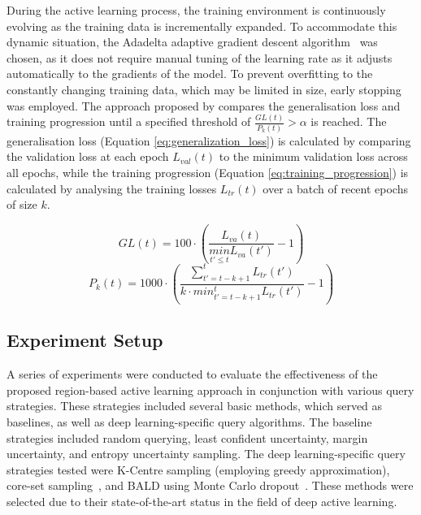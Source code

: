 During the active learning process, the training environment is continuously evolving as the training data is incrementally expanded. To accommodate this dynamic situation, the Adadelta adaptive gradient descent algorithm~\citep{zeiler2012adadelta} was chosen, as it does not require manual tuning of the learning rate as it adjusts automatically to the gradients of the model. To prevent overfitting to the constantly changing training data, which may be limited in size, early stopping was employed. The approach proposed by \cite{prechelt2012early} compares the generalisation loss and training progression until a specified threshold of $\frac{GL(t)}{P_k(t)} > \alpha$ is reached. The generalisation loss (Equation \ref{eq:generalization_loss}) is calculated by comparing the validation loss at each epoch $L_{val}(t)$ to the minimum validation loss across all epochs, while the training progression (Equation \ref{eq:training_progression}) is calculated by analysing the training losses $L_{tr}(t)$ over a batch of recent epochs of size $k$.

\begin{equation}
	GL(t) = 100 \cdot \left ( \frac{L_{va}(t)}{\underset{t'\leq t}{min}L_{va}(t')} - 1 \right )
	\label{eq:generalization_loss}
\end{equation}
\begin{equation}
	P_k(t) = 1000 \cdot \left ( \frac{\sum_{t'=t-k+1}^{t}L_{tr}(t')}{k \cdot min^{t}_{t'=t-k+1}L_{tr}(t')} - 1\right )
	\label{eq:training_progression}
\end{equation}

\subsection{Experiment Setup}
\label{subsec:active_experiments}
A series of experiments were conducted to evaluate the effectiveness of the proposed region-based active learning approach in conjunction with various query strategies. These strategies included several basic methods, which served as baselines, as well as deep learning-specific query algorithms. The baseline strategies included random querying, least confident uncertainty, margin uncertainty, and entropy uncertainty sampling. The deep learning-specific query strategies tested were K-Centre sampling (employing greedy approximation), core-set sampling~\citep{sener2017active}, and BALD using Monte Carlo dropout~\citep{gal2017deep}. These methods were selected due to their state-of-the-art status in the field of deep active learning. 


